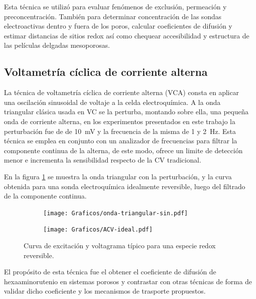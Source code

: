 	 		Esta técnica se utilizó para evaluar fenómenos de exclusión, permeación y preconcentración. También para determinar concentración de las sondas electroactivas dentro y fuera de los poros, calcular coeficientes de difusión y estimar distancias de sitios redox así como chequear accesibilidad y estructura de las películas delgadas mesoporosas.

	 \subsection{Voltametría cíclica de corriente alterna}

	 		La técnica de voltametría cíclica de corriente alterna (VCA) consta en aplicar una oscilación sinusoidal de voltaje a la celda electroquímica. A la onda triangular clásica usada en VC se la perturba, montando sobre ella, una pequeña onda de corriente alterna, en los experimentos presentados en este trabajo la perturbación fue de de \SI{10}{\milli\volt} y la frecuencia de la misma de 1 y \SI{2}{\hertz}. Esta técnica se emplea en conjunto con un analizador de frecuencias para filtrar la componente continua de la alterna, de este modo, ofrece un limite de detección menor e incrementa la sensibilidad respecto de la CV tradicional.\cite{Wi2000,Skoog1995}

	 		En la figura \ref{fig:ACV_ideal} se muestra la onda triangular con la perturbación, y la curva obtenida para una sonda electroquímica idealmente reversible, luego del filtrado de la componente continua.

	 			 \begin{figure}[ht]
			  		  \begin{subfigure}[t]{0.495\textwidth}
			  		  \texttt{[image: Graficos/onda-triangular-sin.pdf]}
			  		  \end{subfigure}
			  		  \begin{subfigure}[t]{0.495\textwidth}
			  		  \texttt{[image: Graficos/ACV-ideal.pdf]}
			  		  \end{subfigure}
			  		  \caption[Voltamperometria ideal reversible]{Curva de excitación y voltagrama típico para una especie redox reversible.}
			  		  \label{fig:ACV_ideal}
			  		  \end{figure}
	 		
	 		El propósito de esta técnica fue el obtener el coeficiente de difusión de hexaaminorutenio en sistemas porosos y contrastar con otras técnicas de forma de validar dicho coeficiente y los mecanismos de trasporte propuestos. 
			
